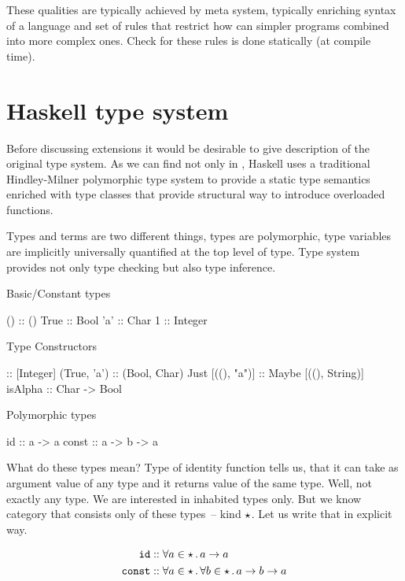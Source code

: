 \documentclass[11pt,oneside,draft]{fithesis2}
\newtheorem{example}{Example}
\begin{document}
These qualities are typically achieved by meta system, typically
enriching syntax of a language and set of rules that restrict how can
simpler programs combined into more complex ones.
Check for these rules is done statically (at compile time).

\section{Haskell type system}

Before discussing extensions it would be desirable to give description
of the original type system.
As we can find not only in \cite{haskell2010}, Haskell uses a traditional
Hindley-Milner polymorphic type system to provide a static type
semantics enriched with type classes that provide structural way to
introduce overloaded functions.

Types and terms are two different things, types are polymorphic,
type variables are implicitly universally quantified at the top level of type.
Type system provides not only type checking but also type inference.

Basic/Constant types
\begin{code}
()   :: ()
True :: Bool
'a'  :: Char
1    :: Integer
\end{code}

Type Constructors
\begin{code}
[1, 2, 3]        :: [Integer]
(True, 'a')      :: (Bool, Char)
Just [((), "a")] :: Maybe [((), String)]
isAlpha          :: Char -> Bool
\end{code}

Polymorphic types
\begin{code}
id    :: a -> a
const :: a -> b -> a
\end{code}

What do these types mean? Type of identity function tells us, that
it can take as argument value of any type and it returns value of the
same type. Well, not exactly any type. We are interested in inhabited
types only. But we know category that consists only of these types~--
kind \(\star\). Let us write that in explicit way.

\begin{align*}
\texttt{id} & :: \forall a \in {\star} \, . \, a \to a \\
\texttt{const} & :: \forall a \in {\star} \, . \, \forall b \in {\star} \, . \, a \to b \to a \\
\end{align*}
\end{document}
